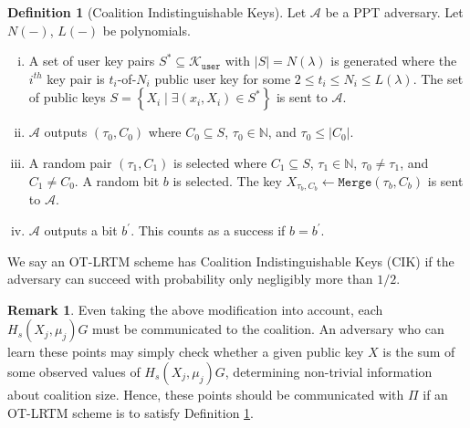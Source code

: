 \documentclass{mrl}
\theoremstyle{definition}
\newtheorem{defn}[theorem]{Definition}
\newtheorem{disc}[theorem]{Remark}
\begin{document}
\begin{defn}[Coalition Indistinguishable Keys]\label{threshIndist} Let $\mathcal{A}$ be a PPT adversary. Let $N(-)$, $L(-)$ be polynomials.
\begin{enumerate}[(i)]
\item A set of user key pairs $S^* \subseteq \mathcal{K}_{\texttt{user}}$ with $\left|S\right|=N(\lambda)$ is generated where the $i^{th}$ key pair is $t_i$-of-$N_i$ public user key for some $2 \leq t_i \leq N_i \leq L(\lambda)$. The set of public keys $S = \left\{X_i \mid \exists (x_i, X_i) \in S^*\right\}$ is sent to $\mathcal{A}$.

\item $\mathcal{A}$ outputs $(\tau_0,C_0)$ where $C_0 \subseteq S$, $\tau_0 \in \mathbb{N}$, and $\tau_0 \leq \left|C_0\right|$.

\item A random pair $(\tau_1, C_1)$ is selected where $C_1 \subseteq S$, $\tau_1 \in \mathbb{N}$, $\tau_0 \neq \tau_1$, and $C_1 \neq C_0$. A random bit $b$ is selected. The key $X_{\tau_b,C_b} \leftarrow \texttt{Merge}(\tau_b, C_b)$ is sent to $\mathcal{A}$.

\item $\mathcal{A}$ outputs a bit $b^{\prime}$. This counts as a success if $b=b^{\prime}$.
\end{enumerate}
We say an OT-LRTM scheme has Coalition Indistinguishable Keys (CIK) if the adversary can succeed with probability only negligibly more than $1/2$.
\end{defn}



\begin{disc}
Even taking the above modification into account, each $H_s(X_j, \mu_j)G$ must be communicated to the coalition. An adversary who can learn these points may simply check whether a given public key $X$ is the sum of some observed values of $H_s(X_j, \mu_j)G$, determining non-trivial information about coalition size. Hence, these points should be communicated with $\Pi$ if an OT-LRTM scheme is to satisfy Definition \ref{threshIndist}.
\end{disc}
\end{document}
